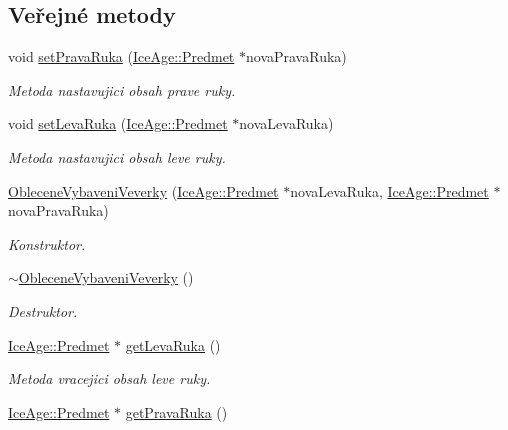 \subsection*{Veřejné metody}
\begin{DoxyCompactItemize}
\item 
void \hyperlink{classIceAge_1_1ObleceneVybaveniVeverky_a81c50b90cae451476735b88f3cdecb07}{set\+Prava\+Ruka} (\hyperlink{classIceAge_1_1Predmet}{Ice\+Age\+::\+Predmet} $\ast$nova\+Prava\+Ruka)
\begin{DoxyCompactList}\small\item\em Metoda nastavujici obsah prave ruky. \end{DoxyCompactList}\item 
void \hyperlink{classIceAge_1_1ObleceneVybaveniVeverky_a2e4266a7941707c95f8ec2c41a7b97bb}{set\+Leva\+Ruka} (\hyperlink{classIceAge_1_1Predmet}{Ice\+Age\+::\+Predmet} $\ast$nova\+Leva\+Ruka)
\begin{DoxyCompactList}\small\item\em Metoda nastavujici obsah leve ruky. \end{DoxyCompactList}\item 
\hyperlink{classIceAge_1_1ObleceneVybaveniVeverky_a54867f1ea6c86eb1cbbba398cd1d240c}{Oblecene\+Vybaveni\+Veverky} (\hyperlink{classIceAge_1_1Predmet}{Ice\+Age\+::\+Predmet} $\ast$nova\+Leva\+Ruka, \hyperlink{classIceAge_1_1Predmet}{Ice\+Age\+::\+Predmet} $\ast$nova\+Prava\+Ruka)
\begin{DoxyCompactList}\small\item\em Konstruktor. \end{DoxyCompactList}\item 
\hyperlink{classIceAge_1_1ObleceneVybaveniVeverky_abbae9463d9fa2fa3205dfbedcd92153c}{$\sim$\+Oblecene\+Vybaveni\+Veverky} ()
\begin{DoxyCompactList}\small\item\em Destruktor. \end{DoxyCompactList}\item 
\hyperlink{classIceAge_1_1Predmet}{Ice\+Age\+::\+Predmet} $\ast$ \hyperlink{classIceAge_1_1ObleceneVybaveniVeverky_adf269e5fce3b68334fb50fbeb6992b18}{get\+Leva\+Ruka} ()
\begin{DoxyCompactList}\small\item\em Metoda vracejici obsah leve ruky. \end{DoxyCompactList}\item 
\hyperlink{classIceAge_1_1Predmet}{Ice\+Age\+::\+Predmet} $\ast$ \hyperlink{classIceAge_1_1ObleceneVybaveniVeverky_a0ca3d404578b0099b97fc7910d5e718a}{get\+Prava\+Ruka} ()

\end{DoxyCompactItemize}
